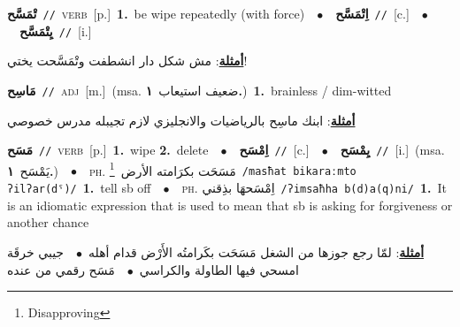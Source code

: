 \documentclass[10pt,a4paper,twoside]{article} %
\begin{document}
\begin{multicols}{2}
{\setlength\topsep{0pt}\textbf{\foreignlanguage{arabic}{تْمَسَّح}}\ {\color{gray}\texttt{//}\color{black}}\ \textsc{verb}\ [p.]\ \textbf{1.}~be wipe repeatedly (with force)\ \ $\bullet$\ \ \setlength\topsep{0pt}\textbf{\foreignlanguage{arabic}{اِتْمَسَّح}}\ {\color{gray}\texttt{//}\color{black}}\ [c.]\ \ $\bullet$\ \ \setlength\topsep{0pt}\textbf{\foreignlanguage{arabic}{يِتْمَسَّح}}\ {\color{gray}\texttt{//}\color{black}}\ [i.]\  \begin{flushright}\color{gray}\foreignlanguage{arabic}{\textbf{\underline{\foreignlanguage{arabic}{أمثلة}}}: مش شكل دار انشطفت وتْمَسَّحت يختي!}\end{flushright}\color{black}} \vspace{2mm}

{\setlength\topsep{0pt}\textbf{\foreignlanguage{arabic}{مَاسِح}}\ {\color{gray}\texttt{//}\color{black}}\ \textsc{adj}\ [m.]\ \color{gray}(msa. \foreignlanguage{arabic}{ضعيف استيعاب}~\foreignlanguage{arabic}{\textbf{١.}})\color{black}\ \textbf{1.}~brainless / dim-witted\  \begin{flushright}\color{gray}\foreignlanguage{arabic}{\textbf{\underline{\foreignlanguage{arabic}{أمثلة}}}: ابنك ماسِح بالرياضيات والانجليزي لازم تجيبله مدرس خصوصي}\end{flushright}\color{black}} \vspace{2mm}

{\setlength\topsep{0pt}\textbf{\foreignlanguage{arabic}{مَسَح}}\ {\color{gray}\texttt{//}\color{black}}\ \textsc{verb}\ [p.]\ \textbf{1.}~wipe  \textbf{2.}~delete\ \ $\bullet$\ \ \setlength\topsep{0pt}\textbf{\foreignlanguage{arabic}{اِمْسَح}}\ {\color{gray}\texttt{//}\color{black}}\ [c.]\ \ $\bullet$\ \ \setlength\topsep{0pt}\textbf{\foreignlanguage{arabic}{يِمْسَح}}\ {\color{gray}\texttt{//}\color{black}}\ [i.]\ \color{gray}(msa. \foreignlanguage{arabic}{يَمْسَح}~\foreignlanguage{arabic}{\textbf{١.}})\color{black}\ \ $\bullet$\ \ \textsc{ph.} \color{gray} \foreignlanguage{arabic}{مَسَحَت بكرَامته الأرض}\color{black}\ \footnote{Disapproving}\ {\color{gray}\texttt{/{\sffamily masħat bikaraːmto ʔilʔar(dˤ)}/}\color{black}}\ \textbf{1.}~tell sb off\ \ $\bullet$\ \ \textsc{ph.} \color{gray} \foreignlanguage{arabic}{اِمْسَحهَا بذِقني}\color{black}\ {\color{gray}\texttt{/{\sffamily ʔimsaħha b(d)a(q)ni}/}\color{black}}\ \textbf{1.}~It is an idiomatic expression that is used to mean that sb is asking for forgiveness or another chance\  \begin{flushright}\color{gray}\foreignlanguage{arabic}{\textbf{\underline{\foreignlanguage{arabic}{أمثلة}}}: لمّا رجع جوزها من الشغل مَسَحَت بكَرامتُه الأَرْض قدام أهله\ $\bullet$\ \  جيبي خرقَة امسحي فيها الطاولة والكراسي\ $\bullet$\ \  مَسَح رقمي من عنده}\end{flushright}\color{black}} \vspace{2mm}


\end{multicols}
\end{document}
